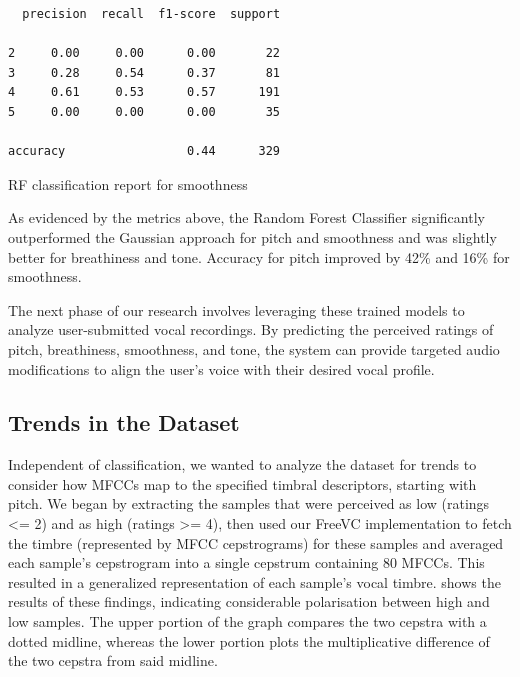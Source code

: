 \documentclass{article}
\begin{document}
\begin{table}
\begin{verbatim}
  precision  recall  f1-score  support

2     0.00     0.00      0.00       22
3     0.28     0.54      0.37       81
4     0.61     0.53      0.57      191
5     0.00     0.00      0.00       35

accuracy                 0.44      329
\end{verbatim}
\caption{RF classification report for smoothness}
\end{table}

As evidenced by the metrics above, the Random Forest Classifier significantly outperformed the Gaussian approach for pitch and smoothness and was slightly better for breathiness and tone. Accuracy for pitch improved by 42\% and 16\% for smoothness.

The next phase of our research involves leveraging these trained models to analyze user-submitted vocal recordings. By predicting the perceived ratings of pitch, breathiness, smoothness, and tone, the system can provide targeted audio modifications to align the user's voice with their desired vocal profile.


\subsection{Trends in the Dataset}

Independent of classification, we wanted to analyze the dataset for trends to consider how MFCCs map to the specified timbral descriptors, starting with pitch. We began by extracting the samples that were perceived as low (ratings <= 2) and as high (ratings >= 4), then used our FreeVC implementation to fetch the timbre (represented by MFCC cepstrograms) for these samples and averaged each sample's cepstrogram into a single cepstrum containing 80 MFCCs. This resulted in a generalized representation of each sample's vocal timbre.  shows the results of these findings, indicating considerable polarisation between high and low samples. The upper portion of the graph compares the two cepstra with a dotted midline, whereas the lower portion plots the multiplicative difference of the two cepstra from said midline.
\end{document}
